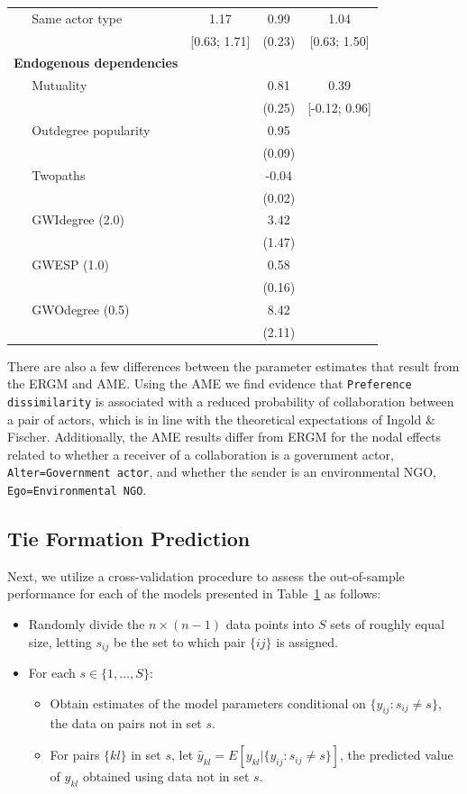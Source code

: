 \begin{table}[ht]
\begin{tabular}{lccc}
  $\;\;\;\;$ Same actor type & 1.17 & 0.99 & 1.04 \\
   & [0.63; 1.71] & (0.23) & [0.63; 1.50] \\
  \textbf{Endogenous dependencies}  &  &  &  \\
  $\;\;\;\;$ Mutuality &  & 0.81 & 0.39 \\
   &  & (0.25) & [-0.12; 0.96] \\
  $\;\;\;\;$ Outdegree popularity  &  & 0.95 &  \\
   &  & (0.09) &  \\
  $\;\;\;\;$ Twopaths  &  & -0.04 &  \\
  &  & (0.02) &  \\
  $\;\;\;\;$ GWIdegree (2.0)  &  & 3.42 &  \\
   &  & (1.47) &  \\
  $\;\;\;\;$ GWESP (1.0)  &  & 0.58 &  \\
   &  & (0.16) &  \\
  $\;\;\;\;$ GWOdegree (0.5)  &  & 8.42 &  \\
   &  & (2.11) &  \\
   \hline
\hline
\end{tabular}
\label{tab:regTable}
\end{table}
\FloatBarrier

There are also a few differences between the parameter estimates that result from the ERGM and AME. Using the AME we find evidence that \texttt{Preference dissimilarity} is associated with a reduced probability of collaboration between a pair of actors, which is in line with the theoretical expectations of Ingold \& Fischer. Additionally, the AME results differ from ERGM for the nodal effects related to whether a receiver of a collaboration is a government actor, \texttt{Alter=Government actor}, and whether the sender is an environmental NGO, \texttt{Ego=Environmental NGO}.

\subsection*{Tie Formation Prediction}

Next, we utilize a cross-validation procedure to assess the out-of-sample performance for each of the models presented in Table~\ref{tab:regTable} as follows:

\begin{itemize}
	\item Randomly divide the $n \times (n-1)$ data points into $S$ sets of roughly equal size, letting $s_{ij}$ be the set to which pair $\{ij\}$ is assigned.
	\item For each $s \in \{1, \ldots, S\}$:
	\begin{itemize}
		\item Obtain estimates of the model parameters conditional on $\{y_{ij} : s_{ij} \neq s\}$, the data on pairs not in set $s$.
		\item For pairs $\{kl\}$ in set $s$, let $\hat y_{kl} = E[y_{kl} | \{y_{ij} : s_{ij} \neq s\}]$, the predicted value of $y_{kl}$ obtained using data not in set $s$.
	\end{itemize}
\end{itemize}

